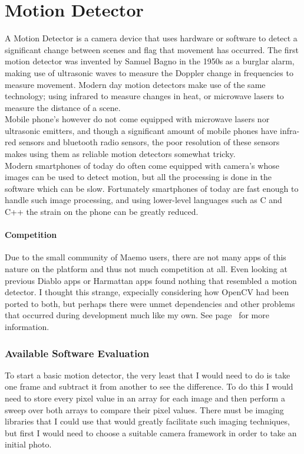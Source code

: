 \documentclass[11pt]{article} %
\begin{document}



\part{Motion Detector}
A Motion Detector is a camera device that uses hardware or software to detect a significant change between scenes and flag that movement has occurred. The first motion detector was invented by Samuel Bagno in the 1950s as a burglar alarm, making use of ultrasonic waves to measure the Doppler change in frequencies to measure movement. Modern day motion detectors make use of the same technology; using infrared to measure changes in heat, or microwave lasers to measure the distance of a scene.\\
Mobile phone's however do not come equipped with microwave lasers nor ultrasonic emitters, and though a significant amount of mobile phones have infra-red sensors and bluetooth radio sensors, the poor resolution of these sensors makes using them as reliable motion detectors somewhat tricky.\\
Modern smartphones of today do often come equipped with camera's whose images can be used to detect motion, but all the processing is done in the software which can be slow. Fortunately smartphones of today are fast enough to handle such image processing, and using lower-level languages such as C and C++ the strain on the phone can be greatly reduced.

\subsection{Competition}
Due to the small community of Maemo users, there are not many apps of this nature on the platform and thus not much competition at all. Even looking at previous Diablo apps or Harmattan apps found nothing that resembled a motion detector. I thought this strange, expecially considering how OpenCV had been ported to both, but perhaps there were unmet dependencies and other problems that occurred during development much like my own. See page~\pageref{opencvdocu} for more information.

\section{Available Software Evaluation}
To start a basic motion detector, the very least that I would need to do is take one frame and subtract it from another to see the difference. To do this I would need to store every pixel value in an array for each image and then perform a sweep over both arrays to compare their pixel values. There must be imaging libraries that I could use that would greatly facilitate such imaging techniques, but first I would need to choose a suitable camera framework in order to take an initial photo.
\end{document}
